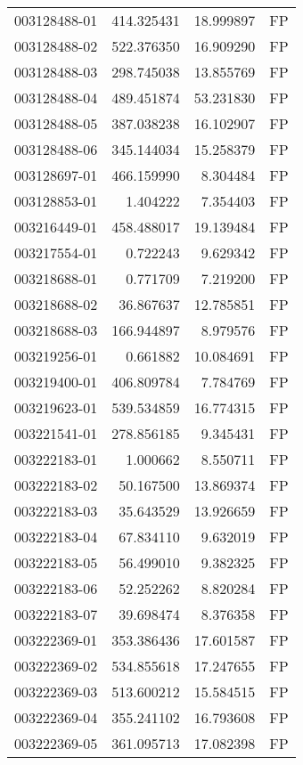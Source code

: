 \begin{tabular}{lrrl}
003128488-01 &  414.325431 &    18.999897 &   FP \\
003128488-02 &  522.376350 &    16.909290 &   FP \\
003128488-03 &  298.745038 &    13.855769 &   FP \\
003128488-04 &  489.451874 &    53.231830 &   FP \\
003128488-05 &  387.038238 &    16.102907 &   FP \\
003128488-06 &  345.144034 &    15.258379 &   FP \\
003128697-01 &  466.159990 &     8.304484 &   FP \\
003128853-01 &    1.404222 &     7.354403 &   FP \\
003216449-01 &  458.488017 &    19.139484 &   FP \\
003217554-01 &    0.722243 &     9.629342 &   FP \\
003218688-01 &    0.771709 &     7.219200 &   FP \\
003218688-02 &   36.867637 &    12.785851 &   FP \\
003218688-03 &  166.944897 &     8.979576 &   FP \\
003219256-01 &    0.661882 &    10.084691 &   FP \\
003219400-01 &  406.809784 &     7.784769 &   FP \\
003219623-01 &  539.534859 &    16.774315 &   FP \\
003221541-01 &  278.856185 &     9.345431 &   FP \\
003222183-01 &    1.000662 &     8.550711 &   FP \\
003222183-02 &   50.167500 &    13.869374 &   FP \\
003222183-03 &   35.643529 &    13.926659 &   FP \\
003222183-04 &   67.834110 &     9.632019 &   FP \\
003222183-05 &   56.499010 &     9.382325 &   FP \\
003222183-06 &   52.252262 &     8.820284 &   FP \\
003222183-07 &   39.698474 &     8.376358 &   FP \\
003222369-01 &  353.386436 &    17.601587 &   FP \\
003222369-02 &  534.855618 &    17.247655 &   FP \\
003222369-03 &  513.600212 &    15.584515 &   FP \\
003222369-04 &  355.241102 &    16.793608 &   FP \\
003222369-05 &  361.095713 &    17.082398 &   FP \\

\end{tabular}

